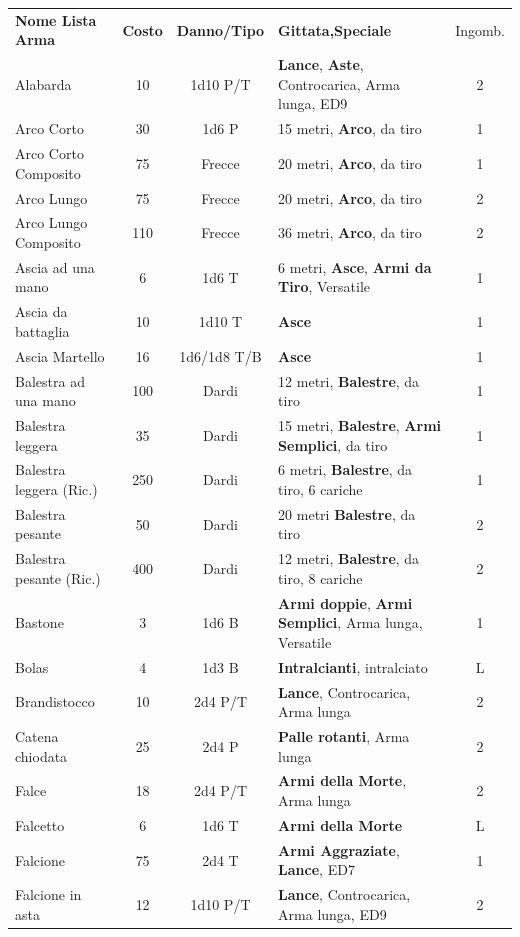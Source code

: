 \documentclass[a4paper,11pt,twoside,openany]{book}
\begin{document}
\begin{tabularx}{1\textwidth}{lccXc}
	\textbf{Nome Lista Arma}& \textbf{Costo} & \textbf{Danno/Tipo} & \textbf{Gittata,Speciale} & Ingomb.\\
	
	Alabarda& 10 & 1d10 P/T& \textbf{Lance}, \textbf{Aste}, Controcarica, Arma lunga, ED9 & 2\\
	Arco Corto& 30 & 1d6 P& 15 metri, \textbf{Arco}, da tiro& 1\\
	Arco Corto Composito& 75 & Frecce& 20 metri, \textbf{Arco}, da tiro& 1\\
	Arco Lungo& 75 & Frecce& 20 metri, \textbf{Arco}, da tiro& 2\\
	Arco Lungo Composito& 110& Frecce& 36 metri, \textbf{Arco}, da tiro& 2\\
	Ascia ad una mano& 6  & 1d6 T& 6 metri, \textbf{Asce}, \textbf{Armi da Tiro}, Versatile& 1\\
	Ascia da battaglia& 10 & 1d10 T&\textbf{Asce}& 1\\
	Ascia Martello& 16 & 1d6/1d8 T/B& \textbf{Asce}& 1\\
	Balestra ad una mano& 100& Dardi& 12 metri, \textbf{Balestre}, da tiro& 1\\
	Balestra leggera& 35 & Dardi& 15 metri, \textbf{Balestre}, \textbf{Armi Semplici}, da tiro& 1\\
	Balestra leggera (Ric.) & 250& Dardi & 6 metri, \textbf{Balestre}, da tiro, 6 cariche& 1\\
	Balestra pesante& 50 & Dardi& 20 metri \textbf{Balestre}, da tiro& 2\\
	Balestra pesante (Ric.) & 400& Dardi& 12 metri, \textbf{Balestre}, da tiro, 8 cariche& 2\\
	Bastone& 3& 1d6 B& \textbf{Armi doppie}, \textbf{Armi Semplici}, Arma lunga, Versatile& 1\\
	Bolas& 4& 1d3 B&\textbf{Intralcianti}, intralciato& L\\
	Brandistocco& 10 & 2d4 P/T& \textbf{Lance}, Controcarica, Arma lunga& 2\\
	Catena chiodata& 25 & 2d4 P& \textbf{Palle rotanti}, Arma lunga& 2\\
	Falce& 18 & 2d4 P/T& \textbf{Armi della Morte}, Arma lunga& 2\\
	Falcetto& 6& 1d6 T& \textbf{Armi della Morte} & L\\
	Falcione& 75 & 2d4 T& \textbf{Armi Aggraziate}, \textbf{Lance}, ED7& 1\\
	Falcione in asta& 12 & 1d10 P/T& \textbf{Lance}, Controcarica, Arma lunga, ED9& 2\\

\end{tabularx}
\end{document}
